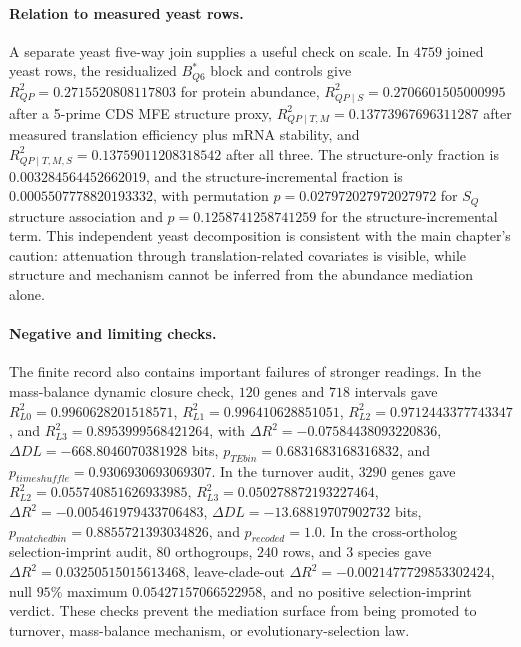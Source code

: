 \paragraph{Relation to measured yeast rows.}
A separate yeast five-way join supplies a useful check on scale.  In $4759$ joined yeast rows, the residualized $B^*_{Q6}$ block and controls give $R^2_{QP}=0.2715520808117803$ for protein abundance, $R^2_{QP\mid S}=0.2706601505000995$ after a 5-prime CDS MFE structure proxy, $R^2_{QP\mid T,M}=0.13773967696311287$ after measured translation efficiency plus mRNA stability, and $R^2_{QP\mid T,M,S}=0.13759011208318542$ after all three.  The structure-only fraction is $0.003284564452662019$, and the structure-incremental fraction is $0.0005507778820193332$, with permutation $p=0.027972027972027972$ for $S_Q$ structure association and $p=0.1258741258741259$ for the structure-incremental term.  This independent yeast decomposition is consistent with the main chapter's caution: attenuation through translation-related covariates is visible, while structure and mechanism cannot be inferred from the abundance mediation alone.

\paragraph{Negative and limiting checks.}
The finite record also contains important failures of stronger readings.  In the mass-balance dynamic closure check, $120$ genes and $718$ intervals gave $R^2_{L0}=0.9960628201518571$, $R^2_{L1}=0.996410628851051$, $R^2_{L2}=0.9712443377743347$, and $R^2_{L3}=0.8953999568421264$, with $\Delta R^2=-0.07584438093220836$, $\Delta DL=-668.8046070381928$ bits, $p_{TEbin}=0.6831683168316832$, and $p_{timeshuffle}=0.9306930693069307$.  In the turnover audit, $3290$ genes gave $R^2_{L2}=0.055740851626933985$, $R^2_{L3}=0.050278872193227464$, $\Delta R^2=-0.005461979433706483$, $\Delta DL=-13.68819707902732$ bits, $p_{matchedbin}=0.8855721393034826$, and $p_{recoded}=1.0$.  In the cross-ortholog selection-imprint audit, $80$ orthogroups, $240$ rows, and $3$ species gave $\Delta R^2=0.03250515015613468$, leave-clade-out $\Delta R^2=-0.0021477729853302424$, null $95\%$ maximum $0.05427157066522958$, and no positive selection-imprint verdict.  These checks prevent the mediation surface from being promoted to turnover, mass-balance mechanism, or evolutionary-selection law.

